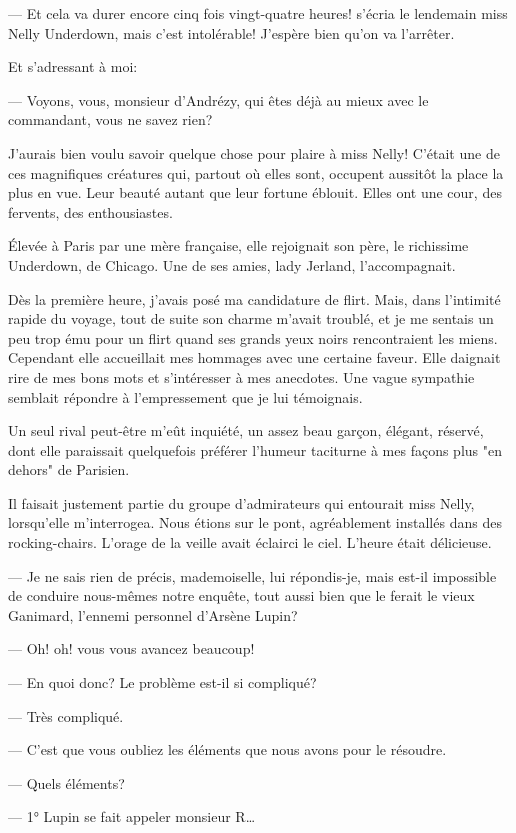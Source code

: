 \documentclass[12pt,a4paper]{book}
\begin{document}
— Et cela va durer encore cinq fois vingt-quatre heures! s’écria le lendemain miss Nelly Underdown, mais c’est intolérable! J’espère bien qu’on va l’arrêter. 

Et s’adressant à moi:

— Voyons, vous, monsieur d’Andrézy, qui êtes déjà au mieux avec le commandant, vous ne savez rien?

J’aurais bien voulu savoir quelque chose pour plaire à miss Nelly! C’était une de ces magnifiques créatures qui, partout où elles sont, occupent aussitôt la place la plus en vue. Leur beauté autant que leur fortune éblouit. Elles ont une cour, des fervents, des enthousiastes.

Élevée à Paris par une mère française, elle rejoignait son père, le richissime Underdown, de Chicago. Une de ses amies, lady Jerland, l’accompagnait.

Dès la première heure, j’avais posé ma candidature de flirt. Mais, dans l’intimité rapide du voyage, tout de suite son charme m’avait troublé, et je me sentais un peu trop ému pour un flirt quand ses grands yeux noirs rencontraient les miens. Cependant elle accueillait mes hommages avec une certaine faveur. Elle daignait rire de mes bons mots et s’intéresser à mes anecdotes. Une vague sympathie semblait répondre à l’empressement que je lui témoignais.

Un seul rival peut-être m’eût inquiété, un assez beau garçon, élégant, réservé, dont elle paraissait quelquefois préférer l’humeur taciturne à mes façons plus "en dehors" de Parisien.

Il faisait justement partie du groupe d’admirateurs qui entourait miss Nelly, lorsqu’elle m’interrogea. Nous étions sur le pont, agréablement installés dans des rocking-chairs. L’orage de la veille avait éclairci le ciel. L’heure était délicieuse.

— Je ne sais rien de précis, mademoiselle, lui répondis-je, mais est-il impossible de conduire nous-mêmes notre enquête, tout aussi bien que le ferait le vieux Ganimard, l’ennemi personnel d’Arsène Lupin?

— Oh! oh! vous vous avancez beaucoup!

— En quoi donc? Le problème est-il si compliqué?

— Très compliqué.

— C’est que vous oubliez les éléments que nous avons pour le résoudre.

— Quels éléments?

— 1° Lupin se fait appeler monsieur R…
\end{document}

